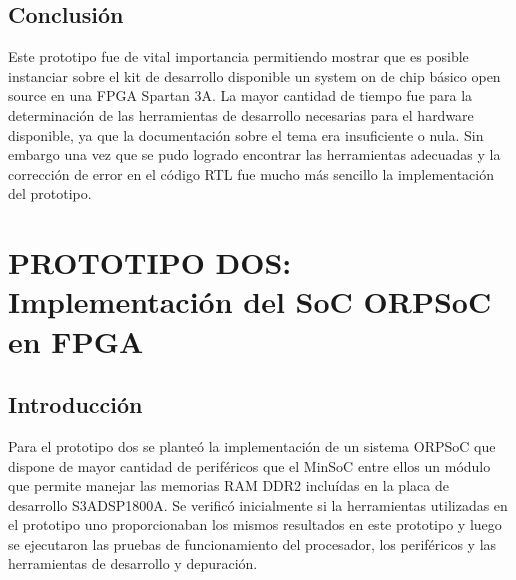 		\subsection{Conclusión}
Este prototipo fue de vital importancia permitiendo mostrar que es posible instanciar sobre el kit de desarrollo disponible un system on de chip básico open source en una FPGA Spartan 3A.
La mayor cantidad de tiempo fue para la  determinación de las herramientas de desarrollo necesarias para el hardware disponible, ya que la documentación sobre el tema era insuficiente o nula. Sin embargo una vez que se pudo logrado encontrar las herramientas adecuadas y  la corrección de error en el código RTL fue mucho más sencillo la implementación del prototipo.
		
\newpage
		
	\section{PROTOTIPO DOS: Implementación del SoC ORPSoC en FPGA}
		\subsection{Introducción}
		Para el prototipo dos se planteó la implementación de un sistema ORPSoC que dispone de mayor cantidad de periféricos que el MinSoC entre ellos un
		módulo que permite manejar las memorias RAM DDR2 incluídas en la placa de desarrollo S3ADSP1800A. Se verificó inicialmente si la herramientas
		utilizadas en el prototipo uno proporcionaban los mismos resultados en este prototipo y luego se ejecutaron las pruebas de funcionamiento del
		procesador, los periféricos y las herramientas de desarrollo y depuración. 
		
